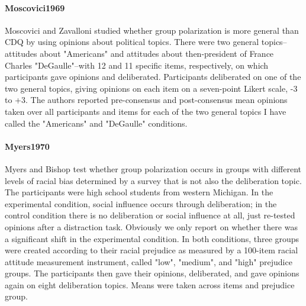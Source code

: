 \documentclass[12pt, letterpaper]{article}
\begin{document}
\paragraph{{Moscovici1969}} Moscovici and Zavalloni studied whether group
polarization is more general than CDQ by using opinions about political topics. There
were two general topics--attitudes about "Americans" and attitudes about then-president
of France Charles "DeGaulle"--with 12 and 11 specific items, respectively, on which
participants gave opinions and deliberated. Participants deliberated on one of the two
general topics, giving opinions on each item on a seven-point Likert scale, -3 to +3.
The authors reported pre-consensus and post-consensus mean opinions taken over all
participants and items for each of the two general topics I have called the "Americans"
and "DeGaulle" conditions.

\paragraph{{Myers1970}} Myers and Bishop test whether group polarization occurs
in groups with different levels of racial bias determined by a survey that is not also
the deliberation topic. The participants were high school students from western
Michigan. In the experimental condition, social influence occurs through deliberation;
in the control condition there is no deliberation or social influence at all, just
re-tested opinions after a distraction task. Obviously we only report on whether there
was a significant shift in the experimental condition. In both conditions, three groups
were created according to their racial prejudice as measured by a 100-item racial
attitude measurement instrument, called "low", "medium", and "high" prejudice groups.
The participants then gave their opinions, deliberated, and gave opinions again on
eight deliberation topics. Means were taken across items and prejudice group.
\end{document}
